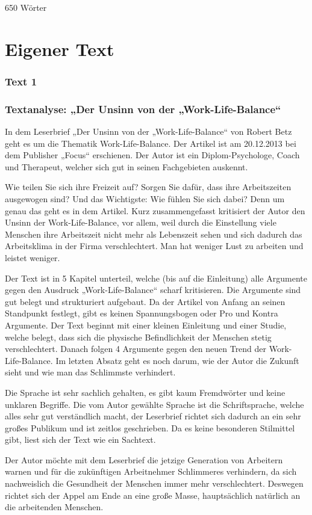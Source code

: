 650 Wörter 
\section{Eigener Text}
\subsubsection{Text 1}
\subsubsection{Textanalyse: „Der Unsinn von der „Work-Life-Balance“}
In dem Leserbrief „Der Unsinn von der „Work-Life-Balance“ von Robert Betz geht es um die Thematik Work-Life-Balance. Der Artikel ist am 20.12.2013 bei dem Publisher „Focus“ erschienen. Der Autor ist ein Diplom-Psychologe, Coach und Therapeut, welcher sich gut in seinen Fachgebieten auskennt.  

Wie teilen Sie sich ihre Freizeit auf? Sorgen Sie dafür, dass ihre Arbeitszeiten ausgewogen sind? Und das Wichtigste: Wie fühlen Sie sich dabei? Denn um genau das geht es in dem Artikel. Kurz zusammengefasst kritisiert der Autor den Unsinn der Work-Life-Balance, vor allem, weil durch die Einstellung viele Menschen ihre Arbeitszeit nicht mehr als Lebenszeit sehen und sich dadurch das Arbeitsklima in der Firma verschlechtert. Man hat weniger Lust zu arbeiten und leistet weniger.  

Der Text ist in 5 Kapitel unterteil, welche (bis auf die Einleitung) alle Argumente gegen den Ausdruck „Work-Life-Balance“ scharf kritisieren. Die Argumente sind gut belegt und strukturiert aufgebaut. Da der Artikel von Anfang an seinen Standpunkt festlegt, gibt es keinen Spannungsbogen oder Pro und Kontra Argumente. Der Text beginnt mit einer kleinen Einleitung und einer Studie, welche belegt, dass sich die physische Befindlichkeit der Menschen stetig verschlechtert. Danach folgen 4 Argumente gegen den neuen Trend der Work-Life-Balance.    Im letzten Absatz geht es noch darum, wie der Autor die Zukunft sieht und wie man das Schlimmste verhindert. 

Die Sprache ist sehr sachlich gehalten, es gibt kaum Fremdwörter und keine unklaren Begriffe. Die vom Autor gewählte Sprache ist die Schriftsprache, welche alles sehr gut verständlich macht, der Leserbrief richtet sich dadurch an ein sehr großes Publikum und ist zeitlos geschrieben. Da es keine besonderen Stilmittel gibt, liest sich der Text wie ein Sachtext.  

Der Autor möchte mit dem Leserbrief die jetzige Generation von Arbeitern warnen und für die zukünftigen Arbeitnehmer Schlimmeres verhindern, da sich nachweislich die Gesundheit der Menschen immer mehr verschlechtert. Deswegen richtet sich der Appel am Ende an eine große Masse, hauptsächlich natürlich an die arbeitenden Menschen. 


